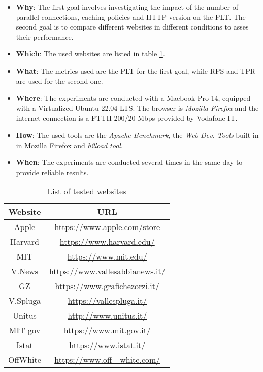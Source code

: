 \begin{itemize}[leftmargin=9pt]
\item \textbf{Why}: The first goal involves investigating the impact of the number of parallel connections, caching policies and HTTP version on the PLT. The second goal is to compare different websites 
in different conditions to asses their performance.
\item \textbf{Which}: The used websites are listed in table \ref{tab:websites}.
\item \textbf{What}: The metrics used are the PLT for the first goal, while RPS and TPR are used for the second one.
\item \textbf{Where}: The experiments are conducted with a Macbook Pro 14, equipped with a Virtualized Ubuntu 22.04 LTS.
The browser is \textit{Mozilla Firefox} and the internet connection is a FTTH 200/20 Mbps provided by Vodafone IT.
\item \textbf{How}: The used tools are the \textit{Apache Benchmark}, the \textit{Web Dev. Tools} built-in in Mozilla Firefox and \textit{h2load tool}.
\item \textbf{When}: The experiments are conducted several times in the same day to provide reliable results.
\end{itemize}

\begin{table}[H]
    \small
    \centering
    \begin{tabular}{|c|c|}
    \hline
    \rowcolor{pyblue!60}
    \textbf{Website} & \textbf{URL} \\ \hline
    Apple & \url{https://www.apple.com/store} \\ 
    Harvard & \url{https://www.harvard.edu/} \\ 
    MIT & \url{https://www.mit.edu/} \\ 
    V.News & \url{https://www.vallesabbianews.it/} \\ 
    GZ & \url{https://www.grafichezorzi.it/} \\ 
    V.Spluga & \url{https://vallespluga.it/} \\ 
    Unitus & \url{http://www.unitus.it/} \\ 
    MIT gov & \url{https://www.mit.gov.it/} \\ 
    Istat & \url{https://www.istat.it/} \\ 
    OffWhite & \url{https://www.off---white.com/}\\ \hline
    \end{tabular}
    \caption{\small List of tested websites}
    \label{tab:websites}
\end{table}

